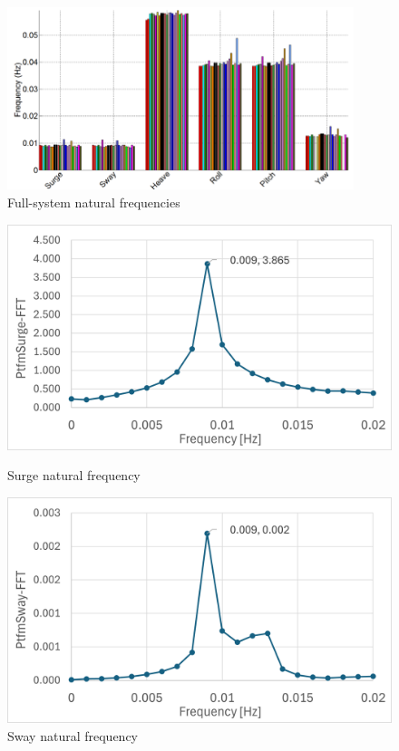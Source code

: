 \documentclass[a4paper, 11pt]{article}
\begin{document}

\begin{figure}[H]
    \centering
    \includegraphics[width=0.9\textwidth]{nat_freq.png}
    \caption{\small Full-system natural frequencies \cite{Robertson2014}}
    \label{fig:nat_freq}
\end{figure}

\begin{figure}[H]
    \begin{minipage}{0.49\textwidth}
        \centering
        \includegraphics[width=1\textwidth]{nat_freq_surge.png}
        \caption{\small Surge natural frequency}
        \label{fig:nat_freq_surge}
    \end{minipage}
    \hfill
    \begin{minipage}{0.5\textwidth}
        \centering
        \includegraphics[width=1\textwidth]{nat_freq_sway.png}
        \caption{\small Sway natural frequency}
        \label{fig:nat_freq_sway}
    \end{minipage}
\end{figure}
\end{document}
